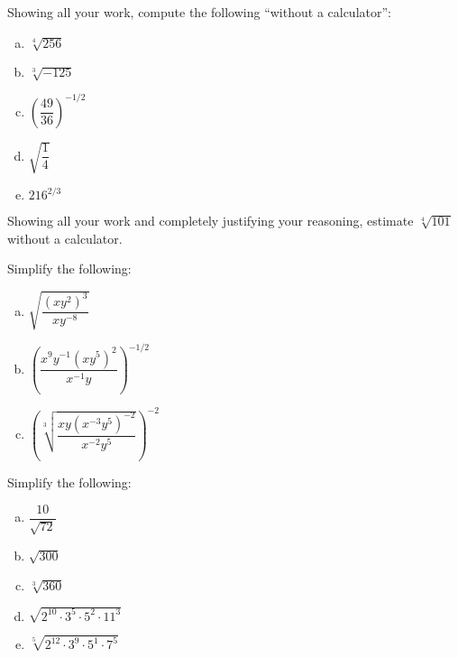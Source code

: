 \documentclass[11pt,letterpaper]{article}
\begin{document}

 Showing all your work, compute the following ``without a calculator'': 
	\begin{enumerate}[(a)]
	\item $\sqrt[4]{256}$
	\item $\sqrt[3]{-125}$
	\item $\left( \dfrac{49}{36} \right)^{-1/2}$
	\item $\sqrt{\dfrac{1}{4}}$
	\item $216^{2/3}$
	\end{enumerate}   



\newpage



 Showing all your work and completely justifying your reasoning, estimate $\sqrt[4]{101}$ without a calculator. 



\newpage



 Simplify the following:
	\begin{enumerate}[(a)]
	\item $\sqrt{\dfrac{(x y^2)^3}{x y^{-8}}}$
	\item $\left( \dfrac{x^9 y^{-1} (x y^5)^2}{x^{-1} y} \right)^{-1/2}$
	\item $\left( \sqrt[3]{\dfrac{xy (x^{-3} y^5)^{-2}}{x^{-2} y^5}} \right)^{-2}$
	\end{enumerate}   	



\newpage



 Simplify the following:
	\begin{enumerate}[(a)]
	\item $\dfrac{10}{\sqrt{72}}$
	\item $\sqrt{300}$
	\item $\sqrt[3]{360}$
	\item $\sqrt{2^{10} \cdot 3^5 \cdot 5^2 \cdot 11^3}$
	\item $\sqrt[5]{2^{12} \cdot 3^9 \cdot 5^1 \cdot 7^5}$
	\end{enumerate}   
\end{document}
